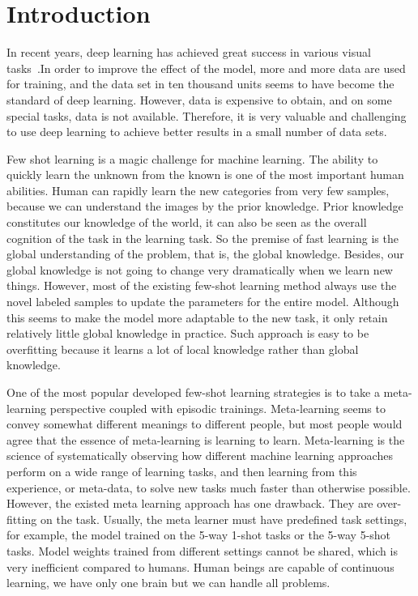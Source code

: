 \documentclass[runningheads]{llncs}
\begin{document}
\section{Introduction}
In recent years, deep learning has achieved great success in various visual tasks~\cite{he2016deep,lecun2015deep,long2015fully,ronneberger2015u}.In order to improve the effect of the model, more and more data are used for training, and the data set in ten thousand units seems to have become the standard of deep learning. However, data is expensive to obtain, and on some special tasks, data is not available. Therefore, it is very valuable and challenging to use deep learning to achieve better results in a small number of data sets.

Few shot learning is a magic challenge for machine learning. The ability to quickly learn the unknown from the known is one of the most important human abilities. Human can rapidly learn the new categories from very few samples, because we can understand the images by the prior knowledge. Prior knowledge constitutes our knowledge of the world, it can also be seen as the overall cognition of the task in the learning task. So the premise of fast learning is the global understanding of the problem, that is, the global knowledge. Besides, our global knowledge is not going to change very dramatically when we learn new things. However, most of the existing few-shot learning method always use the novel labeled samples to update the parameters for the entire model. Although this seems to make the model more adaptable to the new task, it only retain relatively little global knowledge in practice. Such approach is easy to be overfitting because it learns a lot of local knowledge rather than global knowledge.

One of the most popular developed few-shot learning strategies is to take a meta-learning perspective coupled with episodic trainings. Meta-learning seems to convey somewhat different meanings to different people, but most people would agree that the essence of meta-learning is learning to learn. Meta-learning is the science of systematically observing how different machine learning approaches perform on a wide range of learning tasks, and then learning from this experience, or meta-data, to solve new tasks much faster than otherwise possible. However, the existed meta learning approach has one drawback. They are over-fitting on the task. Usually, the meta learner must have predefined task settings, for example, the model trained on the 5-way 1-shot tasks or the 5-way 5-shot tasks. Model weights trained from different settings cannot be shared, which is very inefficient compared to humans. Human beings are capable of continuous learning, we have only one brain but we can handle all problems.
\end{document}
